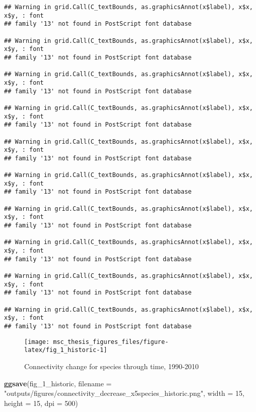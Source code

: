 \documentclass[
]{article}
\newenvironment{Shaded}{\begin{snugshade}}{\end{snugshade}}
\newcommand{\DataTypeTok}[1]{\textcolor[rgb]{0.13,0.29,0.53}{#1}}
\newcommand{\DecValTok}[1]{\textcolor[rgb]{0.00,0.00,0.81}{#1}}
\newcommand{\KeywordTok}[1]{\textcolor[rgb]{0.13,0.29,0.53}{\textbf{#1}}}
\newcommand{\NormalTok}[1]{#1}
\newcommand{\StringTok}[1]{\textcolor[rgb]{0.31,0.60,0.02}{#1}}
\begin{document}
\begin{verbatim}
## Warning in grid.Call(C_textBounds, as.graphicsAnnot(x$label), x$x, x$y, : font
## family '13' not found in PostScript font database

## Warning in grid.Call(C_textBounds, as.graphicsAnnot(x$label), x$x, x$y, : font
## family '13' not found in PostScript font database

## Warning in grid.Call(C_textBounds, as.graphicsAnnot(x$label), x$x, x$y, : font
## family '13' not found in PostScript font database

## Warning in grid.Call(C_textBounds, as.graphicsAnnot(x$label), x$x, x$y, : font
## family '13' not found in PostScript font database

## Warning in grid.Call(C_textBounds, as.graphicsAnnot(x$label), x$x, x$y, : font
## family '13' not found in PostScript font database

## Warning in grid.Call(C_textBounds, as.graphicsAnnot(x$label), x$x, x$y, : font
## family '13' not found in PostScript font database

## Warning in grid.Call(C_textBounds, as.graphicsAnnot(x$label), x$x, x$y, : font
## family '13' not found in PostScript font database

## Warning in grid.Call(C_textBounds, as.graphicsAnnot(x$label), x$x, x$y, : font
## family '13' not found in PostScript font database

## Warning in grid.Call(C_textBounds, as.graphicsAnnot(x$label), x$x, x$y, : font
## family '13' not found in PostScript font database

## Warning in grid.Call(C_textBounds, as.graphicsAnnot(x$label), x$x, x$y, : font
## family '13' not found in PostScript font database
\end{verbatim}

\begin{figure}
\texttt{[image: msc\_thesis\_figures\_files/figure-latex/fig\_1\_historic-1]} \caption{Connectivity change for species through time, 1990-2010}\label{fig:fig_1_historic}
\end{figure}

\begin{Shaded}
\begin{Highlighting}[]
\KeywordTok{ggsave}\NormalTok{(fig_}\DecValTok{1}\NormalTok{_historic,}
       \DataTypeTok{filename =} \StringTok{"outputs/figures/connectivity_decrease_x5species_historic.png"}\NormalTok{,}
       \DataTypeTok{width =} \DecValTok{15}\NormalTok{, }\DataTypeTok{height =} \DecValTok{15}\NormalTok{, }\DataTypeTok{dpi =} \DecValTok{500}\NormalTok{)}
\end{Highlighting}
\end{Shaded}
\end{document}
